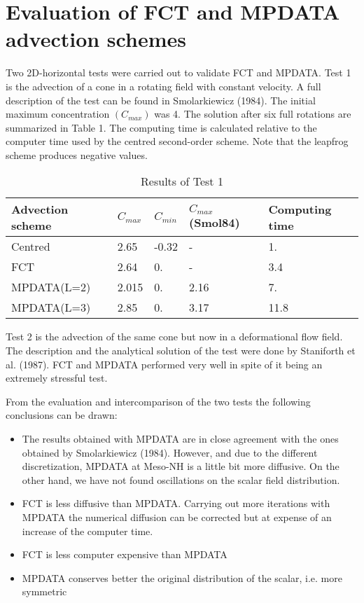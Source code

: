 \section{Evaluation of FCT and MPDATA advection schemes}

Two 2D-horizontal tests were carried out to validate FCT and MPDATA. Test 1 is the
advection of a cone in a rotating field with constant velocity. A full description
of the test can be found in Smolarkiewicz (1984). The initial maximum
concentration $(C_{max})$ was 4. The solution after six full rotations are summarized in Table 1.
The computing time is calculated relative to the computer time used by the centred
second-order
scheme. Note that the leapfrog scheme produces negative values.


\begin{table}[htpb]
  \centering
  \caption{Results of Test 1}
  \begin{tabular}{p{3cm}p{3cm}p{3cm}p{3cm}p{3cm}}
    Advection scheme  &  $C_{max}$  &  $C_{min}$  & $C_{max}$(Smol84)  &  Computing time  \\
    \hline
    \hline
    Centred      &   2.65  &  -0.32 &  -    & 1.      \\
    FCT          &   2.64  &   0.   &  -    & 3.4     \\
    MPDATA(L=2)  &   2.015 &   0.   & 2.16  & 7.       \\
    MPDATA(L=3)  &   2.85  &   0.   & 3.17  &11.8      \\
  \end{tabular}
\end{table}

Test 2 is the advection of the same cone but now in a deformational flow field. The
description and the analytical solution of the test were done by Staniforth et al. (1987).
FCT and MPDATA performed very well in spite of it being an extremely stressful test.

From the evaluation and intercomparison of the two tests
the following conclusions can be drawn:

\begin{itemize}

\item{The results obtained with MPDATA are in close agreement with the ones obtained
by Smolarkiewicz (1984). However, and due to the different discretization, MPDATA
at Meso-NH is a little bit more diffusive. On the other hand, we have not found oscillations
on the scalar field distribution.}

\item{FCT is less diffusive than MPDATA. Carrying out more iterations with MPDATA the
numerical diffusion can be corrected but at expense of an increase of the computer time.}

\item{FCT is less computer expensive than MPDATA}

\item{MPDATA conserves better the original distribution of the scalar, i.e. more symmetric}

\end{itemize}

